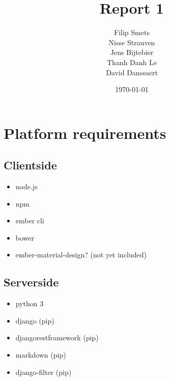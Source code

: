 \documentclass[11pt]{article}
\title{\textbf{Report 1}}
\author{Filip Smets\\
		Nisse Strauven\\
		Jens Bijtebier\\
		Thanh Danh Le\\
		David Danssaert}
\date{\today}
\begin{document}
\maketitle

\section{Platform requirements}
\subsection{Clientside}
\begin{itemize}
\item node.js
\item npm
\item ember cli
\item bower
\item ember-material-design? (not yet included)
\end{itemize}

\subsection{Serverside}
\begin{itemize}
\item python 3
\item django (pip)
\item djangorestframework (pip)
\item markdown (pip)
\item django-filter (pip)
\end{itemize}
\end{document}
